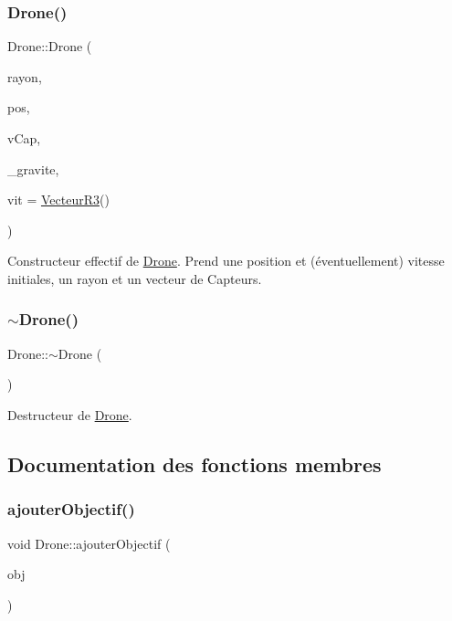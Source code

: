\subsubsection{\texorpdfstring{Drone()}{Drone()}\hspace{0.1cm}{\footnotesize\ttfamily [3/3]}}
{\footnotesize\ttfamily Drone\+::\+Drone (\begin{DoxyParamCaption}\item[{const float}]{rayon,  }\item[{\mbox{\hyperlink{class_vecteur_r3}{Vecteur\+R3}}}]{pos,  }\item[{std\+::vector$<$ \mbox{\hyperlink{class_capteur}{Capteur}} $>$}]{v\+Cap,  }\item[{const \mbox{\hyperlink{class_vecteur_r3}{Vecteur\+R3}}}]{\+\_\+gravite,  }\item[{\mbox{\hyperlink{class_vecteur_r3}{Vecteur\+R3}}}]{vit = {\ttfamily \mbox{\hyperlink{class_vecteur_r3}{Vecteur\+R3}}()} }\end{DoxyParamCaption})}

Constructeur effectif de \mbox{\hyperlink{class_drone}{Drone}}. Prend une position et (éventuellement) vitesse initiales, un rayon et un vecteur de Capteurs. \mbox{\label{class_drone_a667075abb1eb5c54be6418884a387d14}} 
\subsubsection{\texorpdfstring{$\sim$\+Drone()}{~Drone()}}
{\footnotesize\ttfamily Drone\+::$\sim$\+Drone (\begin{DoxyParamCaption}{ }\end{DoxyParamCaption})\hspace{0.3cm}{\ttfamily [virtual]}}

Destructeur de \mbox{\hyperlink{class_drone}{Drone}}. 

\subsection{Documentation des fonctions membres}
\mbox{\label{class_drone_aec517cb61a036852752219bad4e732c1}} 
\subsubsection{\texorpdfstring{ajouter\+Objectif()}{ajouterObjectif()}}
{\footnotesize\ttfamily void Drone\+::ajouter\+Objectif (\begin{DoxyParamCaption}\item[{const \mbox{\hyperlink{class_vecteur_r3}{Vecteur\+R3}} \&}]{obj }\end{DoxyParamCaption})}

